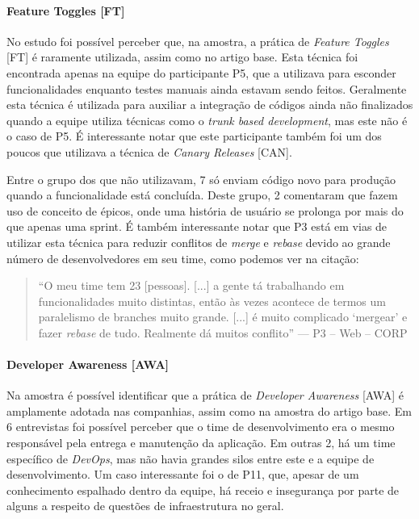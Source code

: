 \paragraph{Feature Toggles [FT]}

No estudo foi possível perceber que, na amostra, a prática de \emph{Feature Toggles} [FT] é raramente utilizada, assim como no artigo base. Esta técnica foi encontrada apenas na equipe do participante P5, que a utilizava para esconder funcionalidades enquanto testes manuais ainda estavam sendo feitos. Geralmente esta técnica é utilizada para auxiliar a integração de códigos ainda não finalizados quando a equipe utiliza técnicas como o \emph{trunk based development}, mas este não é o caso de P5. É interessante notar que este participante também foi um dos poucos que utilizava a técnica de \emph{Canary Releases} [CAN].

Entre o grupo dos que não utilizavam, 7 só enviam código novo para produção quando a funcionalidade está concluída. Deste grupo, 2 comentaram que fazem uso de conceito de épicos, onde uma história de usuário se prolonga por mais do que apenas uma sprint. É também interessante notar que P3 está em vias de utilizar esta técnica para reduzir conflitos de \emph{merge} e \emph{rebase} devido ao grande número de desenvolvedores em seu time, como podemos ver na citação:


\begin{quote}
    ``O meu time tem 23 [pessoas]. [...] a gente tá trabalhando em funcionalidades muito distintas, então às vezes acontece de termos um paralelismo de branches muito grande. [...] é muito complicado `mergear' e fazer \emph{rebase} de tudo. Realmente dá muitos conflito'' --- P3 -- Web -- CORP
\end{quote}


\paragraph{Developer Awareness [AWA]}

Na amostra é possível identificar que a prática de \emph{Developer Awareness} [AWA] é amplamente adotada nas companhias, assim como na amostra do artigo base. Em 6 entrevistas foi possível perceber que o time de desenvolvimento era o mesmo responsável pela entrega e manutenção da aplicação. Em outras 2, há um time específico de \emph{DevOps}, mas não havia grandes silos entre este e a equipe de desenvolvimento. Um caso interessante foi o de P11, que, apesar de um conhecimento espalhado dentro da equipe, há receio e insegurança por parte de alguns a respeito de questões de infraestrutura no geral.


